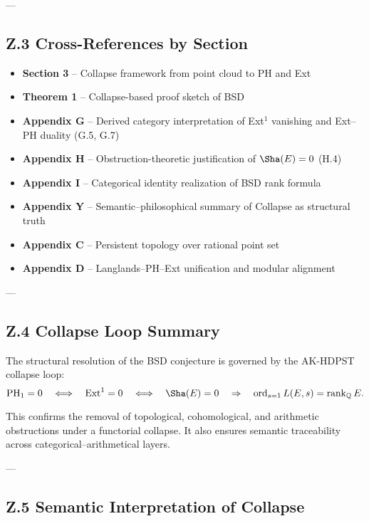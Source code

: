 ---

\subsection*{Z.3 Cross-References by Section}

\begin{itemize}
  \item \textbf{Section 3} – Collapse framework from point cloud to PH and Ext
  \item \textbf{Theorem 1} – Collapse-based proof sketch of BSD
  \item \textbf{Appendix G} – Derived category interpretation of Ext$^1$ vanishing and Ext–PH duality (G.5, G.7)
  \item \textbf{Appendix H} – Obstruction-theoretic justification of \( \Sha(E) = 0 \) (H.4)
  \item \textbf{Appendix I} – Categorical identity realization of BSD rank formula
  \item \textbf{Appendix Y} – Semantic–philosophical summary of Collapse as structural truth
  \item \textbf{Appendix C} – Persistent topology over rational point set
  \item \textbf{Appendix D} – Langlands–PH–Ext unification and modular alignment
\end{itemize}

---

\subsection*{Z.4 Collapse Loop Summary}

The structural resolution of the BSD conjecture is governed by the AK-HDPST collapse loop:
\[
\mathrm{PH}_1 = 0 
\quad \Longleftrightarrow \quad \mathrm{Ext}^1 = 0 
\quad \Longleftrightarrow \quad \Sha(E) = 0 
\quad \Rightarrow \quad \operatorname{ord}_{s=1} L(E,s) = \operatorname{rank}_\mathbb{Q} E.
\]

This confirms the removal of topological, cohomological, and arithmetic obstructions under a functorial collapse.  
It also ensures semantic traceability across categorical–arithmetical layers.

---

\subsection*{Z.5 Semantic Interpretation of Collapse}

